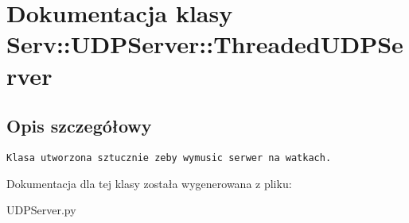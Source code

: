 \hypertarget{class_serv_1_1_u_d_p_server_1_1_threaded_u_d_p_server}{
\section{Dokumentacja klasy Serv::UDPServer::ThreadedUDPServer}
\label{class_serv_1_1_u_d_p_server_1_1_threaded_u_d_p_server}
}


\subsection{Opis szczegółowy}


\footnotesize\begin{verbatim}Klasa utworzona sztucznie zeby wymusic serwer na watkach.\end{verbatim}
\normalsize
 

Dokumentacja dla tej klasy została wygenerowana z pliku:\begin{CompactItemize}
\item 
UDPServer.py\end{CompactItemize}
